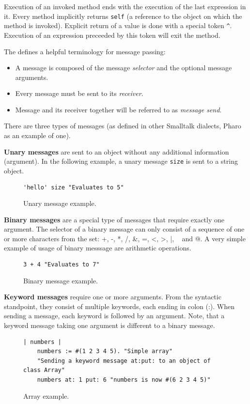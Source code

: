 \documentclass[thesis=M,english]{FITthesis}[2019/12/23]
\begin{document}
Execution of an invoked method ends with the execution of the last expression in it. Every method implicitly
returns \texttt{self} (a reference to the object on which the method is invoked). Explicit return of a value
is done with a special token \texttt{\^}. Execution of an expression preceeded by this token will exit the method.

The \cite{pharo-by-example} defines a helpful terminology for message passing:
\begin{itemize}
	\item A message is composed of the message \textit{selector} and the optional message arguments.
	\item Every message must be sent to its \textit{receiver}.
	\item Message and its receiver together will be referred to as \textit{message send}.
\end{itemize}

There are three types of messages (as defined in other Smalltalk dialects, Pharo as an example of one).

\textbf{Unary messages} are sent to an object without any additional information (argument). In the following
example, a unary message \texttt{size} is sent to a string object.
\begin{figure}[h!]
\begin{lstlisting}[language=Smalltalk]
	'hello' size "Evaluates to 5"
\end{lstlisting}
\caption{Unary message example.}
\end{figure}

\textbf{Binary messages} are a special type of messages that require exactly one argument. The selector
of a binary message can only consist of a sequence of one or more characters from the set: +, -, *, /,
\&, =, \textless, \textgreater, |, ~ and @. A very simple example of usage of binary messsage are arithmetic operations.
\begin{figure}[h!]
\begin{lstlisting}[language=Smalltalk]
	3 + 4 "Evaluates to 7"
\end{lstlisting}
\caption{Binary message example.}
\end{figure}

\textbf{Keyword messages} require one or more arguments. From the syntactic standpoint, they consist of
multiple keywords, each ending in colon (:). When sending a message, each keyword is followed by an argument.
Note, that a keyword message taking one argument is different to a binary message.
\begin{figure}[h!]
\begin{lstlisting}[language=Smalltalk]
	| numbers |
	numbers := #(1 2 3 4 5). "Simple array"
	"Sending a keyword message at:put: to an object of class Array"
	numbers at: 1 put: 6 "numbers is now #(6 2 3 4 5)"
\end{lstlisting}
\caption{Array example.}
\end{figure}
\end{document}
